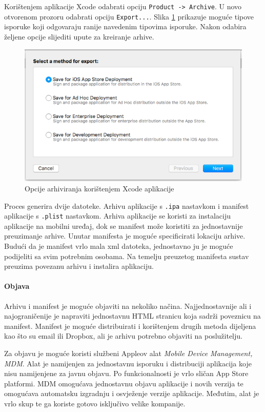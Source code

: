 \documentclass[times, utf8, diplomski, numeric]{fer}
\begin{document}
\begin{appendices}
Korištenjem aplikacije Xcode odabrati opciju \verb|Product -> Archive|. U novo otvorenom prozoru odabrati opciju \verb|Export...|. Slika \ref{fig:XcodeArchiveOptions} prikazuje moguće tipove isporuke koji odgovaraju ranije navedenim tipovima isporuke. Nakon odabira željene opcije slijediti upute za kreiranje arhive.

\begin{figure}
\centering
\includegraphics[scale=0.5]{XcodeArchiveOptions}
\caption{Opcije arhiviranja korištenjem Xcode aplikacije}
\label{fig:XcodeArchiveOptions}
\end{figure}

Proces generira dvije datoteke. Arhivu aplikacije s \verb|.ipa| nastavkom i manifest aplikacije s \verb|.plist| nastavkom. Arhiva aplikacije se koristi za instalaciju aplikacije na mobilni uređaj, dok se manifest može koristiti za jednostavnije preuzimanje arhive. Unutar manifesta je moguće specificirati lokaciju arhive. Budući da je manifest vrlo mala xml datoteka, jednostavno ju je moguće podijeliti sa svim potrebnim osobama. Na temelju preuzetog manifesta sustav preuzima povezanu arhivu i instalira aplikaciju.

\paragraph{Objava} \label{header:rucna_objaca}

Arhivu i manifest je moguće objaviti na nekoliko načina. Najjednostavnije ali i najograničenije je napraviti jednostavnu HTML stranicu koja sadrži poveznicu na manifest. Manifest je moguće distribuirati i korištenjem drugih metoda dijeljena kao što su email ili Dropbox, ali je arhivu potrebno objaviti na poslužitelju.

Za objavu je moguće koristi službeni Appleov alat \textit{Mobile Device Management, MDM}. Alat je namijenjen za jednostavnu isporuku i distribuciji aplikacija koje nisu namijenjene za javnu objavu. Po funkcionalnosti je vrlo sličan App Store platformi. MDM omogućava jednostavnu objavu aplikacije i novih verzija te omogućava automatsku izgradnju i osvježenje verzije aplikacije. Međutim, alat je vrlo skup te ga koriste gotovo isključivo velike kompanije.


\end{appendices}
\end{document}
